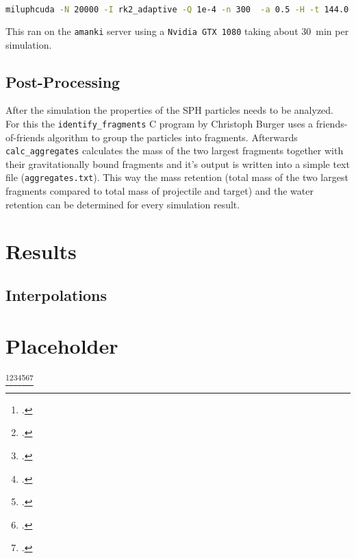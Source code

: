 
\begin{lstlisting}[language=bash]
miluphcuda -N 20000 -I rk2_adaptive -Q 1e-4 -n 300  -a 0.5 -H -t 144.0 -f impact.0000 -m material.cfg -s -g
\end{lstlisting}

This ran on the \texttt{amanki} server using a \texttt{Nvidia GTX 1080} taking about \SI{30}{\minute} per simulation. 


\section{Post-Processing}

After the simulation the properties of the SPH particles needs to be analyzed. For this the \texttt{identify\_fragments} C program by Christoph Burger uses a friends-of-friends algorithm to group the particles into fragments. Afterwards \texttt{calc\_aggregates} calculates the mass of the two largest fragments together with their gravitationally bound fragments and it's output is written into a simple text file (\texttt{aggregates.txt}). This way the mass retention (total mass of the two largest fragments compared to total mass of projectile and target) and the water retention can be determined for every simulation result.


\chapter{Results}

\section{Interpolations}
\appendix
\chapter{Placeholder}

\lipsum[1]\footcite{Schaefer2016}\footcite{dvorakMoon}\footcite{MaindlSummary}\footcite{Burger2018}\footcite{Dorninger}\footcite{CollisionParameters}\footcite{CollisionTypes}

\printbibliography




